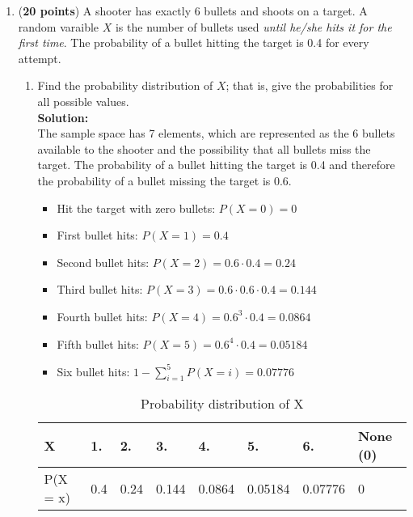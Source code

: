 \documentclass[a4paper]{article}
\begin{document}
\begin{enumerate}


\item (\textbf{20 points}) A shooter has exactly 6 bullets and shoots on a target. A random varaible $X$ is the number of bullets used \textit{until he/she hits it for the first time}. The probability of a bullet hitting the target is 0.4 for every attempt.


\begin{enumerate}
	\item Find the probability distribution of $X$; that is, give the probabilities for all possible values.\\
	\textbf{Solution:}\\
	
	
The sample space has 7 elements, which are represented as the 6 bullets available to the shooter and the possibility that all bullets miss the target. The probability of a bullet hitting the target is 0.4 and therefore the probability of a bullet missing the target is 0.6.\\	

\begin{itemize}
	\item Hit the target with zero bullets: $P(X = 0) = 0$
	\item First bullet hits: $P(X = 1) = 0.4$
	\item Second bullet hits: $P(X = 2) = 0.6 \cdot 0.4 = 0.24$
	\item Third bullet hits: $P(X = 3) = 0.6 \cdot 0.6 \cdot 0.4 = 0.144$
	\item Fourth bullet hits: $P(X = 4) = 0.6^3 \cdot 0.4= 0.0864$
	\item Fifth bullet hits: $P(X = 5) = 0.6^4 \cdot 0.4 = 0.05184$
	\item Six bullet hits: $1 - \sum_{i = 1}^5 P(X = i) = 0.07776$
\end{itemize}

\newpage



\begin{table}[]
\centering
\caption{Probability distribution of X}
\label{my-label}
\begin{tabular}{|l|l|l|l|l|l|l|l|}
\hline
X & 1. & 2. & 3. & 4. & 5. & 6. & None (0)\\ \hline
P(X = x) & 0.4 & 0.24 & 0.144 & 0.0864 & 0.05184 & 0.07776 & 0\\ \hline
\end{tabular}
\end{table}




\end{enumerate}
\end{enumerate}
\end{document}
